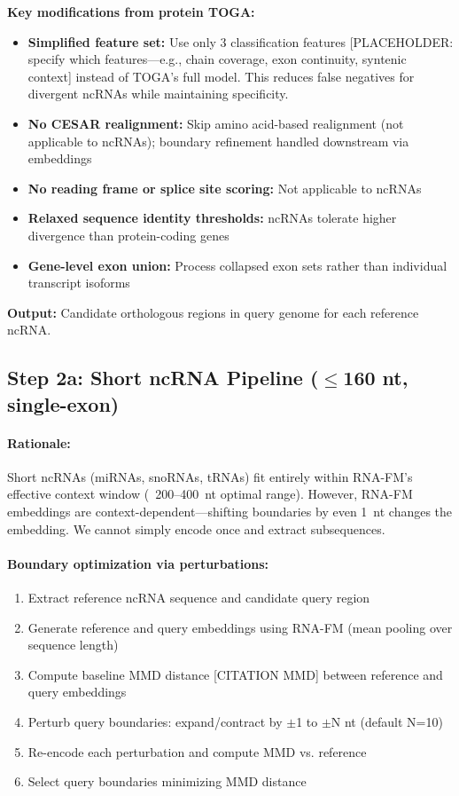 \documentclass[11pt]{article}
\begin{document}
\textbf{Key modifications from protein TOGA:}
\begin{itemize}
\item \textbf{Simplified feature set:} Use only 3 classification features [PLACEHOLDER: specify which features—e.g., chain coverage, exon continuity, syntenic context] instead of TOGA's full model. This reduces false negatives for divergent ncRNAs while maintaining specificity.
\item \textbf{No CESAR realignment:} Skip amino acid-based realignment (not applicable to ncRNAs); boundary refinement handled downstream via embeddings
\item \textbf{No reading frame or splice site scoring:} Not applicable to ncRNAs
\item \textbf{Relaxed sequence identity thresholds:} ncRNAs tolerate higher divergence than protein-coding genes
\item \textbf{Gene-level exon union:} Process collapsed exon sets rather than individual transcript isoforms
\end{itemize}

\textbf{Output:} Candidate orthologous regions in query genome for each reference ncRNA.

\subsection{Step 2a: Short ncRNA Pipeline ($\leq$160 nt, single-exon)}

\paragraph{Rationale:} Short ncRNAs (miRNAs, snoRNAs, tRNAs) fit entirely within RNA-FM's effective context window (~200--400~nt optimal range). However, RNA-FM embeddings are context-dependent—shifting boundaries by even 1~nt changes the embedding. We cannot simply encode once and extract subsequences.

\paragraph{Boundary optimization via perturbations:}
\begin{enumerate}
\item Extract reference ncRNA sequence and candidate query region
\item Generate reference and query embeddings using RNA-FM (mean pooling over sequence length)
\item Compute baseline MMD distance [CITATION MMD] between reference and query embeddings
\item Perturb query boundaries: expand/contract by $\pm$1 to $\pm$N nt (default N=10)
\item Re-encode each perturbation and compute MMD vs. reference
\item Select query boundaries minimizing MMD distance
\end{enumerate}
\end{document}
